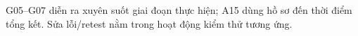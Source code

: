 \begin{landscape}
\noindent G05--G07 diễn ra xuyên suốt giai đoạn thực hiện; A15 dùng hồ sơ đến thời điểm tổng kết. Sửa lỗi/retest nằm trong hoạt động kiểm thử tương ứng.
\end{landscape}
\restoregeometry

